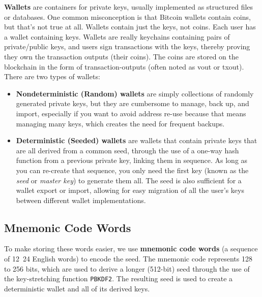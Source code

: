 \documentclass{article}
\begin{document}
    \textbf{Wallets} are containers for private keys, usually implemented as structured files or databases. One common misconception is that Bitcoin wallets contain coins, but that's not true at all. Wallets contain just the keys, not coins. Each user has a wallet containing keys. Wallets are really keychains containing pairs of private/public keys, and users sign transactions with the keys, thereby proving they own the transaction outputs (their coins). The coins are stored on the blockchain in the form of transaction-outputs (often noted as vout or txout). There are two types of wallets:

    \begin{itemize}
      \item \textbf{Nondeterministic (Random) wallets} are simply collections of randomly generated private keys, but they are cumbersome to manage, back up, and import, especially if you want to avoid address re-use because that means managing many keys, which creates the need for frequent backups.
      \item \textbf{Deterministic (Seeded) wallets} are wallets that contain private keys that are all derived from a common seed, through the use of a one-way hash function from a previous private key, linking them in sequence. As long as you can re-create that sequence, you only need the first key (known as the \textit{seed} or \textit{master key}) to generate them all. The seed is also sufficient for a wallet export or import, allowing for easy migration of all the user's keys between different wallet implementations.
    \end{itemize}

  \subsection{Mnemonic Code Words}

    To make storing these words easier, we use \textbf{mnemonic code words} (a sequence of 12~24 English words) to encode the seed. The mnemonic code represents 128 to 256 bits, which are used to derive a longer (512-bit) seed through the use of the key-stretching function \texttt{PBKDF2}. The resulting seed is used to create a deterministic wallet and all of its derived keys.
\end{document}
